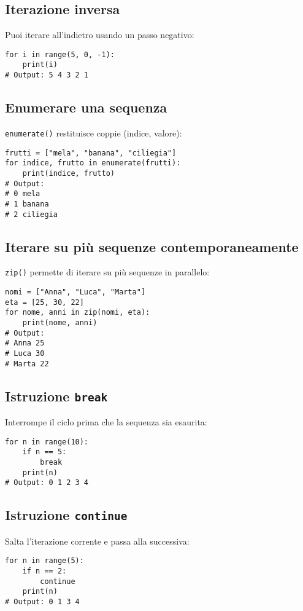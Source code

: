 \documentclass[a4paper,12pt]{article}
\begin{document}
\subsection*{Iterazione inversa}
Puoi iterare all'indietro usando un passo negativo:
\begin{lstlisting}
for i in range(5, 0, -1):
    print(i)
# Output: 5 4 3 2 1
\end{lstlisting}

\subsection*{Enumerare una sequenza}
\texttt{enumerate()} restituisce coppie (indice, valore):
\begin{lstlisting}
frutti = ["mela", "banana", "ciliegia"]
for indice, frutto in enumerate(frutti):
    print(indice, frutto)
# Output:
# 0 mela
# 1 banana
# 2 ciliegia
\end{lstlisting}

\subsection*{Iterare su più sequenze contemporaneamente}
\texttt{zip()} permette di iterare su più sequenze in parallelo:
\begin{lstlisting}
nomi = ["Anna", "Luca", "Marta"]
eta = [25, 30, 22]
for nome, anni in zip(nomi, eta):
    print(nome, anni)
# Output:
# Anna 25
# Luca 30
# Marta 22
\end{lstlisting}

\subsection*{Istruzione \texttt{break}}
Interrompe il ciclo prima che la sequenza sia esaurita:
\begin{lstlisting}
for n in range(10):
    if n == 5:
        break
    print(n)
# Output: 0 1 2 3 4
\end{lstlisting}

\subsection*{Istruzione \texttt{continue}}
Salta l'iterazione corrente e passa alla successiva:
\begin{lstlisting}
for n in range(5):
    if n == 2:
        continue
    print(n)
# Output: 0 1 3 4
\end{lstlisting}
\end{document}
